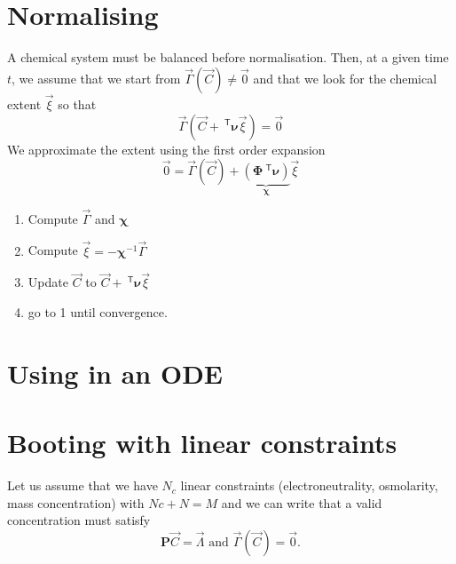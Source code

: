 \documentclass[aps]{revtex4}
\newcommand{\mymat}[1]{\bm{#1}}
\newcommand{\mytrn}[1]{~^{\mathsf{T}}{#1}}
\begin{document}
\section{Normalising}
A chemical system must be balanced before normalisation.
Then, at a given time $t$, we assume that we start from
$\vec{\Gamma}\left(\vec{C}\right)\not=\vec{0}$  and that we look for the chemical
extent $\vec{\xi}$ so that
\begin{equation}
	\vec{\Gamma}\left(\vec{C}+\mytrn{\mymat{\nu}}\vec{\xi}\right) = \vec{0}
\end{equation}
We approximate the extent using the first order expansion
\begin{equation}
	\vec{0} = \vec{\Gamma}\left(\vec{C}\right) + \underbrace{\left(\mymat{\Phi}\mytrn{\mymat{\nu}}\right)}_{\displaystyle \mymat{\chi}} 
	\vec{\xi}
\end{equation}	
\begin{enumerate}
\item Compute $\vec{\Gamma}$ and $\mymat{\chi}$
\item Compute $\vec{\xi}=-\mymat{\chi}^{-1} \vec{\Gamma}$
\item Update  $\vec{C}$ to $\vec{C}+\mytrn{\mymat{\nu}}\vec{\xi}$
\item go to 1 until convergence.
\end{enumerate}

\section{Using in an ODE}

\section{Booting with linear constraints}
Let us assume that we have $N_c$ linear constraints (electroneutrality, osmolarity, mass concentration) with $Nc+N=M$
and we can write that a valid concentration must satisfy
\begin{equation}
	\mymat{P} \vec{C} = \vec{\Lambda} \text{ and } \vec{\Gamma}\left(\vec{C}\right) = \vec{0}.
\end{equation}
\end{document}
